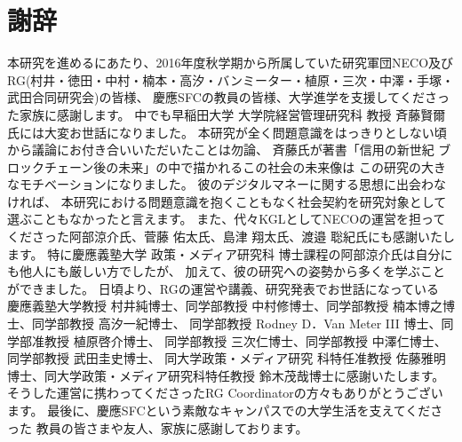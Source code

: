 \chapter*{謝辞}
本研究を進めるにあたり、2016年度秋学期から所属していた研究軍団NECO及び
RG(村井・徳田・中村・楠本・高汐・バンミーター・植原・三次・中澤・手塚・武田合同研究会)の皆様、
慶應SFCの教員の皆様、大学進学を支援してくださった家族に感謝します。
中でも早稲田大学 大学院経営管理研究科 教授 斉藤賢爾氏には大変お世話になりました。
本研究が全く問題意識をはっきりとしない頃から議論にお付き合いいただいたことは勿論、
斉藤氏が著書「信用の新世紀 ブロックチェーン後の未来」\cite{saito2017}の中で描かれるこの社会の未来像は
この研究の大きなモチベーションになりました。
彼のデジタルマネーに関する思想に出会わなければ、
本研究における問題意識を抱くこともなく社会契約を研究対象として選ぶこともなかったと言えます。
また、代々KGLとしてNECOの運営を担ってくださった阿部涼介氏、菅藤 佑太氏、島津 翔太氏、渡邉 聡紀氏にも感謝いたします。
特に慶應義塾大学 政策・メディア研究科 博士課程の阿部涼介氏は自分にも他人にも厳しい方でしたが、
加えて、彼の研究への姿勢から多くを学ぶことができました。
日頃より、RGの運営や講義、研究発表でお世話になっている
慶應義塾大学教授 村井純博士、同学部教授 中村修博士、同学部教授 楠本博之博士、同学部教授 高汐一紀博士、
同学部教授 Rodney D．Van Meter III 博士、同学部准教授 植原啓介博士、
同学部教授 三次仁博士、同学部教授 中澤仁博士、同学部教授 武田圭史博士、
同大学政策・メディア研究 科特任准教授 佐藤雅明博士、同大学政策・メディア研究科特任教授 鈴木茂哉博士に感謝いたします。
そうした運営に携わってくださったRG Coordinatorの方々もありがとうございます。
最後に、慶應SFCという素敵なキャンパスでの大学生活を支えてくださった
教員の皆さまや友人、家族に感謝しております。
